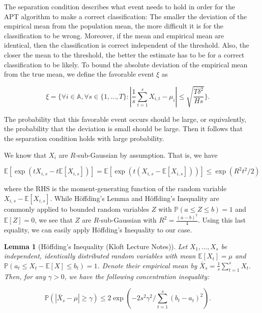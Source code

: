 \documentclass[12pt,]{article}
\newtheorem{lemma}{Lemma}
\begin{document}
The separation condition describes what event needs to hold in order for
the APT algorithm to make a correct classification: The smaller the
deviation of the empirical mean from the population mean, the more
difficult it is for the classification to be wrong. Moreover, if the
mean and empirical mean are identical, then the classification is
correct independent of the threshold. Also, the closer the mean to the
threshold, the better the estimate has to be for a correct
classification to be likely. To bound the absolute deviation of the
empirical mean from the true mean, we define the favorable event \(\xi\)
as

\[
\xi = \Big\{\forall i \in \mathbb{A}, \forall s \in \{1,...,T\} : |\frac{1}{s} \sum_{t=1}^{s}X_{i,t} - \mu_i| \leq \sqrt{\frac{T \delta^2}{H s}} \Big\}.
\]

The probability that this favorable event occurs should be large, or
equivalently, the probability that the deviation is small should be
large. Then it follows that the separation condition holds with large
probability.

We know that \(X_i\) are \(R\)-sub-Gaussian by assumption. That is, we
have

\[
\mathbb{E}[\exp (tX_{i,s}-t\mathbb{E}[X_{i,s}])] = \mathbb{E}[\exp (t(X_{i,s}-\mathbb{E}[X_{i,s}]))] \leq \exp (R^2t^2/2)
\]

where the RHS is the moment-generating function of the random variable
\(X_{i,s}-\mathbb{E}[X_{i,s}]\). While Höffding's Lemma and Höffding's
Inequality are commonly applied to bounded random variables \(Z\) with
\(\mathbb{P}(a\leq Z \leq b) = 1\) and \(\mathbb{E}[Z] = 0\), we see
that \(Z\) are \(R\)-sub-Gaussian with \(R^2 = \frac{(a-b)^2}{4}\).
Using this last equality, we can easily apply Höffding's Inequality to
our case.

\begin{lemma}[Höffding's Inequality (Kloft Lecture Notes)] \label{lemma:HoeffdingsInequality}
Let $X_1, ..., X_s$ be independent, identically distributed random variables with mean $\mathbb{E}[X_t] = \mu$ and $\mathbb{P}(a_t \leq X_t - \mathbb{E}[X] \leq b_t) = 1$. Denote their empirical mean by $\bar{X}_s=\frac{1}{s}\sum_{t=1}^{s}X_t$. Then, for any $\gamma > 0$, we have the following concentration inequality:

\begin{equation*}
\mathbb{P}(|\bar{X}_s - \mu| \geq \gamma) \leq 2\exp (-2s^2\gamma^2/\sum_{t=1}^s(b_t - a_t)^2).
\end{equation*}
\end{lemma}
\end{document}
